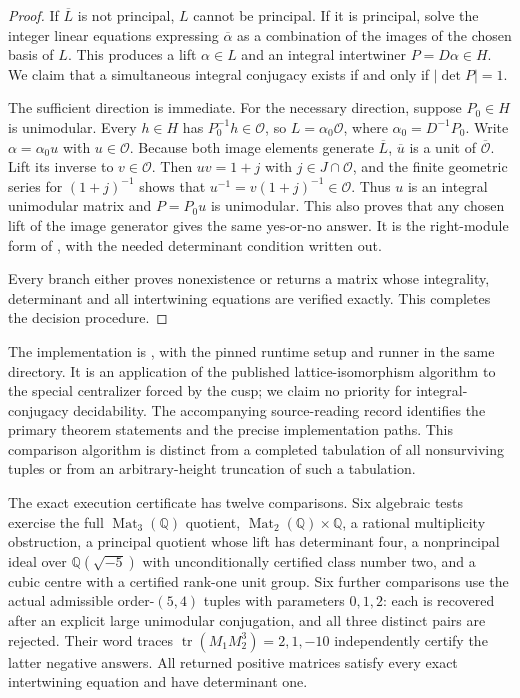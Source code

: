 \begin{proof}
If $\overline L$ is not principal, $L$ cannot be principal. If it is
principal, solve the integer linear equations expressing
$\overline\alpha$ as a combination of the images of the chosen basis
of $L$. This produces a lift $\alpha\in L$ and an integral
intertwiner $P=D\alpha\in H$. We claim that a simultaneous integral
conjugacy exists if and only if $|\det P|=1$.

The sufficient direction is immediate. For the necessary direction,
suppose $P_0\in H$ is unimodular. Every $h\in H$ has
$P_0^{-1}h\in\mathcal O$, so
$L=\alpha_0\mathcal O$, where $\alpha_0=D^{-1}P_0$.
Write $\alpha=\alpha_0u$ with $u\in\mathcal O$.
Because both image elements generate $\overline L$,
$\overline u$ is a unit of $\overline{\mathcal O}$.
Lift its inverse to $v\in\mathcal O$. Then $uv=1+j$ with
$j\in J\cap\mathcal O$, and the finite geometric series for
$(1+j)^{-1}$ shows that $u^{-1}=v(1+j)^{-1}\in\mathcal O$.
Thus $u$ is an integral unimodular matrix and
$P=P_0u$ is unimodular. This also proves that any chosen lift of the
image generator gives the same yes-or-no answer. It is the
right-module form of \cite[Theorem 3.4 and Propositions 8.1--8.2]{rootBHJ22},
with the needed determinant condition written out.

Every branch either proves nonexistence or returns a matrix whose
integrality, determinant and all intertwining equations are verified
exactly. This completes the decision procedure.
\end{proof}

The implementation is
, with the pinned runtime
setup and runner in the same directory. It is an application of the
published lattice-isomorphism algorithm to the special centralizer
forced by the cusp; we claim no priority for integral-conjugacy
decidability. The accompanying source-reading record identifies the
primary theorem statements and the precise implementation paths.
This comparison algorithm is distinct from a completed tabulation
of all nonsurviving tuples or from an arbitrary-height truncation
of such a tabulation.


The exact execution certificate has twelve comparisons. Six algebraic
tests exercise the full $\operatorname{Mat}_3(\mathbb Q)$ quotient,
$\operatorname{Mat}_2(\mathbb Q)\times\mathbb Q$, a rational
multiplicity obstruction, a principal quotient whose lift has
determinant four, a nonprincipal ideal over $\mathbb Q(\sqrt{-5})$
with unconditionally certified class number two, and a cubic
centre with a certified rank-one unit group. Six further comparisons
use the actual admissible order-$(5,4)$ tuples with parameters
$0,1,2$: each is recovered after an explicit large unimodular
conjugation, and all three distinct pairs are rejected. Their word
traces $\operatorname{tr}(M_1M_2^3)=2,1,-10$ independently certify
the latter negative answers. All returned positive matrices satisfy
every exact intertwining equation and have determinant one.
